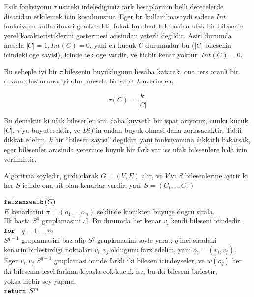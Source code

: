 \documentclass[12pt,fleqn]{article}\usepackage{../common}
\begin{document}
Esik fonksiyonu $\tau$ ustteki irdeledigimiz fark hesaplarinin belli
derecelerde disaridan etkilemek icin koyulmustur. Eger bu kullanilmasaydi
sadece $Int$ fonksiyonu kullanilmasi gerekecekti, fakat bu olcut tek
basina ufak bir bilesenin yerel karakteristiklerini gostermesi acisindan yeterli
degildir. Asiri durumda mesela $|C| = 1,Int(C)=0$, yani en kucuk $C$
durumudur bu ($|C|$ bilesenin icindeki oge sayisi), icinde tek oge vardir,
ve hicbir kenar yoktur, $Int(C) = 0$.  

Bu sebeple iyi bir $\tau$ bilesenin buyuklugunu hesaba katarak, ona ters
oranli bir rakam olusturursa iyi olur, mesela bir sabit $k$ uzerinden,

$$ \tau(C) = \frac{k}{|C|} $$

Bu demektir ki ufak bilesenler icin daha kuvvetli bir ispat ariyoruz, cunku
kucuk $|C|$, $\tau$'yu buyutecektir, ve $Dif$'in ondan buyuk olmasi daha
zorlasacaktir. Tabii dikkat edelim, $k$ bir ``bilesen sayisi'' degildir,
yani fonksiyonuna dikkatli bakarsak, eger bilesenler arasinda yeterince
buyuk bir fark var ise ufak bilesenlere hala izin verilmistir.

Algoritma soyledir, girdi olarak $G=(V,E)$ alir, ve $V$'yi $S$
bilesenlerine ayirir ki her $S$ icinde ona ait olan kenarlar vardir, yani
$S=(C_1,..,C_r)$ 

\begin{algorithm}[h]
\begin{pseudocode}
\codename $\mbox{\texttt{felzenswalb}}\left(G\right)$\\
\codeline \> $E$ kenarlarini $\pi = (o_1,..,o_m)$ seklinde kucukten buyuge dogru sirala. \\
\codeline \> Ilk basta $S^0$ gruplamasini al. Bu durumda her kenar $v_i$
kendi bileseni icindedir. \\ 
\codeline \> $\mbox{\texttt{for }}$ $q = 1,..,m$ \\
\codeline \> \> $S^{q-1}$ gruplamasini baz alip $S^q$ gruplamasini soyle
yarat; $q$'inci siradaki  \\
\codeline \> \> kenarin birlestirdigi noktalari $v_i,v_j$ oldugunu farz
edelim, yani $o_q = (v_i,v_j)$. \\ 
\codeline \> \> Eger $v_i,v_j$ $S^{q-1}$ gruplamasi icinde farkli iki
bilesen icindeyseler, ve $w(o_q)$ her  \\
\codeline \> \> iki bilesenin icsel farkina kiyasla cok kucuk ise, bu iki
bileseni birlestir, \\ 
\codeline \> \> yoksa hicbir sey yapma. \\
\codeline \> $\mbox{\texttt{return }} S^m$ 
\end{pseudocode}
\end{algorithm}
\end{document}
